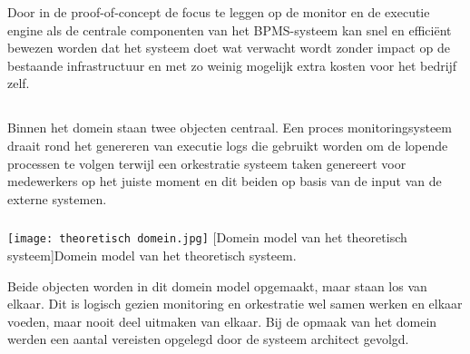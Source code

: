 Door in de proof-of-concept de focus te leggen op de monitor en de executie engine als de centrale componenten van het BPMS-systeem kan snel en efficiënt bewezen worden dat het systeem doet wat verwacht wordt zonder impact op de bestaande infrastructuur en met zo weinig mogelijk extra kosten voor het bedrijf zelf.

\subsection{}%
\label{subsec:domein model}
Binnen het domein staan twee objecten centraal. Een proces monitoringsysteem draait rond het genereren van executie logs die gebruikt worden om de lopende processen te volgen terwijl een orkestratie systeem taken genereert voor medewerkers op het juiste moment en dit beiden op basis van de input van de externe systemen. 

\subsubsection{}%
\label{subsubsec:domein theoretisch systeem}
\begin{center}
  \captionsetup{type=figure}
  \texttt{[image: theoretisch domein.jpg]}
  [Domein model van het theoretisch systeem]{Domein model van het theoretisch systeem.}
\end{center}
Beide objecten worden in dit domein model opgemaakt, maar staan los van elkaar. Dit is logisch gezien monitoring en orkestratie wel samen werken en elkaar voeden, maar nooit deel uitmaken van elkaar. Bij de opmaak van het domein werden een aantal vereisten opgelegd door de systeem architect gevolgd. \newline

